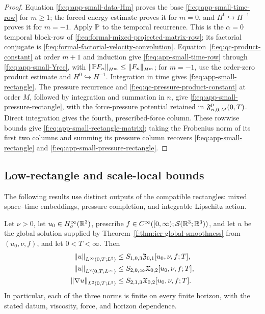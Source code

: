 \begin{proof}
Equation \eqref{f:eq:app-small-data-Hm} proves the base
\eqref{f:eq:app-small-time-row} for \(m\ge1\); the forced energy estimate
proves it for \(m=0\), and \(H^0\hookrightarrow H^{-1}\) proves it for
\(m=-1\).  Apply \(\mathbb P\) to the temporal recurrence.
This is the \(\alpha=0\) temporal block-row of
\eqref{f:eq:formal-mixed-projected-matrix-row}; its factorial conjugate is
\eqref{f:eq:formal-factorial-velocity-convolution}.
Equation~\eqref{f:eq:qc-product-constant} at order \(m+1\) and induction give
\eqref{f:eq:app-small-time-row} through
\eqref{f:eq:app-small-Yrec}, with
\(\left\lVert \mathbb P F_n\right\rVert_{H^m}\le\left\lVert F_n\right\rVert_{H^m}\); for \(m=-1\), use the order-zero product
estimate and \(H^0\hookrightarrow H^{-1}\).  Integration in time gives
\eqref{f:eq:app-small-rectangle}.  The pressure recurrence and
\eqref{f:eq:qc-pressure-product-constant} at order \(M\), followed by
integration and summation in \(n\), give
\eqref{f:eq:app-small-pressure-rectangle}, with the force-pressure potential
retained in \(\mathfrak F^{\rm p}_{n,0,M}(0,T)\).  Direct integration gives
the fourth, prescribed-force column.  These rowwise bounds give
\eqref{f:eq:app-small-rectangle-matrix}; taking the Frobenius norm of its first
two columns and summing its pressure column recovers
\eqref{f:eq:app-small-rectangle} and
\eqref{f:eq:app-small-pressure-rectangle}.
\end{proof}

\subsection{Low-rectangle and scale-local bounds}

The following results use distinct outputs of the compatible rectangles:
mixed space--time embeddings, pressure completion, and integrable Lipschitz
action.

\begin{proposition}
\label{f:prop:app-low-rectangle-classes}
Let \(\nu>0\), let \(u_0\in H^\infty_\sigma(\mathbb R^3)\), prescribe
\(f\in C^\infty([0,\infty);\mathcal S(\mathbb R^3;\mathbb R^3))\), and let \(u\) be the
global solution supplied by
Theorem~\ref{f:thm:ier-global-smoothness} from \((u_0,\nu,f)\), and let
\(0<T<\infty\).  Then
\begin{align}
 \left\lVert u\right\rVert_{L^\infty(0,T;L^3)}
 &\le S_{1,0,3}\mathfrak Z_{0,1}[u_0,\nu,f;T],
 \label{f:eq:app-LinfL3}\\
 \left\lVert u\right\rVert_{L^2(0,T;L^\infty)}
 &\le S_{2,0,\infty}\mathfrak X_{0,2}[u_0,\nu,f;T],
 \label{f:eq:app-L2Linfty}\\
 \left\lVert \nabla u\right\rVert_{L^2(0,T;L^3)}
 &\le S_{2,1,3}\mathfrak X_{0,2}[u_0,\nu,f;T].
 \label{f:eq:app-grad-L2L3}
\end{align}
In particular, each of the three norms is finite on every finite horizon,
with the stated datum, viscosity, force, and horizon dependence.
\end{proposition}

